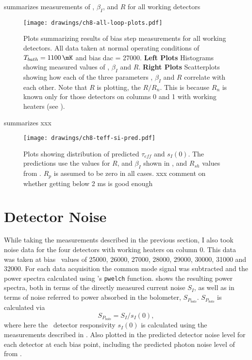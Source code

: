  summarizes measurements of \Loop, $\beta_I$, and $R$ for all working detectors

\begin{figure*}
  \centering
\texttt{[image: drawings/ch8-all-loop-plots.pdf]}
\caption{
  Plots summarizing results of bias step measurements for all working detectors.
All data taken at normal operating conditions of $T_{bath} = \SI{1100}{\mK}$ and bias dac = 27000.
\textbf{Left Plots}
Histograms showing measured values of \Loop, $\beta_I$ and $R$.
\textbf{Right Plots}
Scatterplots showing how each of the three parameters \Loop, $\beta_I$ and $R$ correlate with each other.
Note that $R$ is plotting, the $R/R_n$. This is because $R_n$ is known only for those detectors on columns 0 and 1 with working heaters (see ).
}
\label{fig:ch8-all-loop-plots}
\end{figure*}

 summarizes xxx

\begin{figure*}
  \centering
\texttt{[image: drawings/ch8-teff-si-pred.pdf]}
\caption{
  Plots showing distribution of predicted $\tau_{eff}$ and $s_I(0)$. The predictions use the values for $R$, \Loop and $\beta_I$ shown in , and $R_{sh}$ values from . $R_p$ is assumed to be zero in all cases.
xxx comment on whether getting below 2 ms is good enough
}
\label{fig:ch8-teff-si-pred}
\end{figure*}

\section{Detector Noise} \label{sec:det-noise}

While taking the measurements described in the previous section, I also took noise data for the four detectors with working heaters on column 0.
This data was taken at bias \DAC\ values of 25000, 26000, 27000, 28000, 29000, 30000, 31000 and 32000.
For each data acquisition the common mode signal was subtracted and the power spectra calculated using \MATLAB's \texttt{pwelch} function.
 shows the resulting power spectra, both in terms of the directly measured current noise $S_I$, as well as in terms of noise referred to power absorbed in the bolometer, $S_{P_{bolo}}$.
$S_{P_{bolo}}$ is calculated via
\begin{equation}
 S_{P_{bolo}} = S_I / s_I(0),
\end{equation}
where here the \DC\ detector responsivity $s_I(0)$ is calculated using the measurements described in .
Also plotted in the predicted detector noise level for each detector at each bias point, including the predicted photon noise level of  from .

